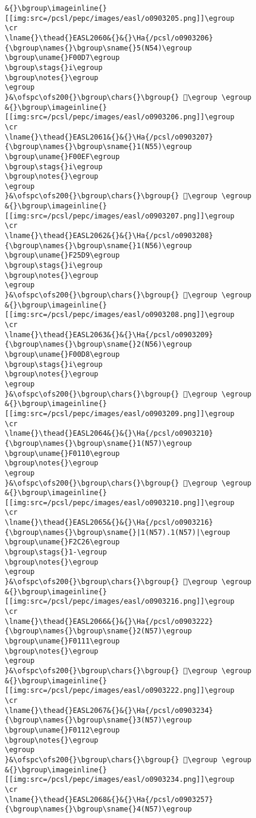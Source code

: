 \begin{verbatim}
&{}\bgroup\imageinline{}[[img:src=/pcsl/pepc/images/easl/o0903205.png]]\egroup
\cr
\lname{}\thead{}EASL2060&{}&{}\Ha{/pcsl/o0903206}{\bgroup\names{}\bgroup\sname{}5(N54)\egroup
\bgroup\uname{}F00D7\egroup
\bgroup\stags{}i\egroup
\bgroup\notes{}\egroup
\egroup
}&\ofspc\ofs200{}\bgroup\chars{}\bgroup{} 󰃗\egroup \egroup
&{}\bgroup\imageinline{}[[img:src=/pcsl/pepc/images/easl/o0903206.png]]\egroup
\cr
\lname{}\thead{}EASL2061&{}&{}\Ha{/pcsl/o0903207}{\bgroup\names{}\bgroup\sname{}1(N55)\egroup
\bgroup\uname{}F00EF\egroup
\bgroup\stags{}i\egroup
\bgroup\notes{}\egroup
\egroup
}&\ofspc\ofs200{}\bgroup\chars{}\bgroup{} 󰃯\egroup \egroup
&{}\bgroup\imageinline{}[[img:src=/pcsl/pepc/images/easl/o0903207.png]]\egroup
\cr
\lname{}\thead{}EASL2062&{}&{}\Ha{/pcsl/o0903208}{\bgroup\names{}\bgroup\sname{}1(N56)\egroup
\bgroup\uname{}F25D9\egroup
\bgroup\stags{}i\egroup
\bgroup\notes{}\egroup
\egroup
}&\ofspc\ofs200{}\bgroup\chars{}\bgroup{} 󲗙\egroup \egroup
&{}\bgroup\imageinline{}[[img:src=/pcsl/pepc/images/easl/o0903208.png]]\egroup
\cr
\lname{}\thead{}EASL2063&{}&{}\Ha{/pcsl/o0903209}{\bgroup\names{}\bgroup\sname{}2(N56)\egroup
\bgroup\uname{}F00D8\egroup
\bgroup\stags{}i\egroup
\bgroup\notes{}\egroup
\egroup
}&\ofspc\ofs200{}\bgroup\chars{}\bgroup{} 󰃘\egroup \egroup
&{}\bgroup\imageinline{}[[img:src=/pcsl/pepc/images/easl/o0903209.png]]\egroup
\cr
\lname{}\thead{}EASL2064&{}&{}\Ha{/pcsl/o0903210}{\bgroup\names{}\bgroup\sname{}1(N57)\egroup
\bgroup\uname{}F0110\egroup
\bgroup\notes{}\egroup
\egroup
}&\ofspc\ofs200{}\bgroup\chars{}\bgroup{} 󰄐\egroup \egroup
&{}\bgroup\imageinline{}[[img:src=/pcsl/pepc/images/easl/o0903210.png]]\egroup
\cr
\lname{}\thead{}EASL2065&{}&{}\Ha{/pcsl/o0903216}{\bgroup\names{}\bgroup\sname{}|1(N57).1(N57)|\egroup
\bgroup\uname{}F2C26\egroup
\bgroup\stags{}1-\egroup
\bgroup\notes{}\egroup
\egroup
}&\ofspc\ofs200{}\bgroup\chars{}\bgroup{} 󲰦\egroup \egroup
&{}\bgroup\imageinline{}[[img:src=/pcsl/pepc/images/easl/o0903216.png]]\egroup
\cr
\lname{}\thead{}EASL2066&{}&{}\Ha{/pcsl/o0903222}{\bgroup\names{}\bgroup\sname{}2(N57)\egroup
\bgroup\uname{}F0111\egroup
\bgroup\notes{}\egroup
\egroup
}&\ofspc\ofs200{}\bgroup\chars{}\bgroup{} 󰄑\egroup \egroup
&{}\bgroup\imageinline{}[[img:src=/pcsl/pepc/images/easl/o0903222.png]]\egroup
\cr
\lname{}\thead{}EASL2067&{}&{}\Ha{/pcsl/o0903234}{\bgroup\names{}\bgroup\sname{}3(N57)\egroup
\bgroup\uname{}F0112\egroup
\bgroup\notes{}\egroup
\egroup
}&\ofspc\ofs200{}\bgroup\chars{}\bgroup{} 󰄒\egroup \egroup
&{}\bgroup\imageinline{}[[img:src=/pcsl/pepc/images/easl/o0903234.png]]\egroup
\cr
\lname{}\thead{}EASL2068&{}&{}\Ha{/pcsl/o0903257}{\bgroup\names{}\bgroup\sname{}4(N57)\egroup

\end{verbatim}
